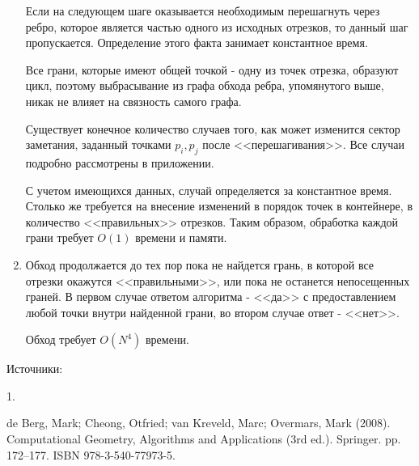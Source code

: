 \documentclass[letterpaper,12pt]{article}
\begin{document}
\begin{enumerate}
            \par
            Если на следующем шаге оказывается необходимым перешагнуть через
            ребро, которое является частью одного из исходных отрезков, то
            данный шаг пропускается. Определение этого факта занимает 
            константное время.
            \par
            Все грани, которые имеют общей точкой - одну из точек отрезка, образуют цикл, 
            поэтому выбрасывание из графа обхода ребра, упомянутого выше, 
            никак не влияет на связность самого графа.
            \par
            Существует конечное количество случаев того, как может изменится
            сектор заметания, заданный точками $p_i, p_j$ после <<перешагивания>>.
            Все случаи подробно рассмотрены в приложении.
            \par
            С учетом имеющихся данных, случай определяется за 
            константное время. Столько же требуется на внесение изменений 
            в порядок точек в контейнере, в количество <<правильных>>
            отрезков.       
            Таким образом, обработка каждой грани требует $O(1)$ времени и памяти. 
      \item Обход продолжается до тех пор пока не найдется грань, 
            в которой все отрезки окажутся <<правильными>>, или пока не
            останется непосещенных граней. В первом случае ответом 
            алгоритма - <<да>> с предоставлением любой точки внутри 
            найденной грани, во втором случае ответ - <<нет>>.
            \par
            Обход требует $O(N^4)$ времени.
\end{enumerate}
\par
Источники:
\par
\hypertarget{literature_1}{1.} de Berg, Mark; Cheong, Otfried; van Kreveld, Marc; Overmars, Mark (2008). 
Computational Geometry, Algorithms and Applications (3rd ed.). 
Springer. pp. 172–177. ISBN 978-3-540-77973-5.
\end{document}
